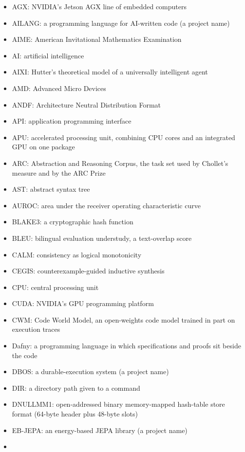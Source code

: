 \documentclass[10pt,letterpaper]{article}
\providecommand{\tightlist}{\setlength{\itemsep}{1pt}\setlength{\parskip}{0pt}}
\begin{document}
\begin{itemize}
\tightlist
\item
  AGX: NVIDIA's Jetson AGX line of embedded computers
\item
  AILANG: a programming language for AI-written code (a project name)
\item
  AIME: American Invitational Mathematics Examination
\item
  AI: artificial intelligence
\item
  AIXI: Hutter's theoretical model of a universally intelligent agent
\item
  AMD: Advanced Micro Devices
\item
  ANDF: Architecture Neutral Distribution Format
\item
  API: application programming interface
\item
  APU: accelerated processing unit, combining CPU cores and an
  integrated GPU on one package
\item
  ARC: Abstraction and Reasoning Corpus, the task set used by Chollet's
  measure and by the ARC Prize
\item
  AST: abstract syntax tree
\item
  AUROC: area under the receiver operating characteristic curve
\item
  BLAKE3: a cryptographic hash function
\item
  BLEU: bilingual evaluation understudy, a text-overlap score
\item
  CALM: consistency as logical monotonicity
\item
  CEGIS: counterexample-guided inductive synthesis
\item
  CPU: central processing unit
\item
  CUDA: NVIDIA's GPU programming platform
\item
  CWM: Code World Model, an open-weights code model trained in part on
  execution traces
\item
  Dafny: a programming language in which specifications and proofs sit
  beside the code
\item
  DBOS: a durable-execution system (a project name)
\item
  DIR: a directory path given to a command
\item
  DNULLMM1: open-addressed binary memory-mapped hash-table store format
  (64-byte header plus 48-byte slots)
\item
  EB-JEPA: an energy-based JEPA library (a project name)
\item

\end{itemize}
\end{document}

